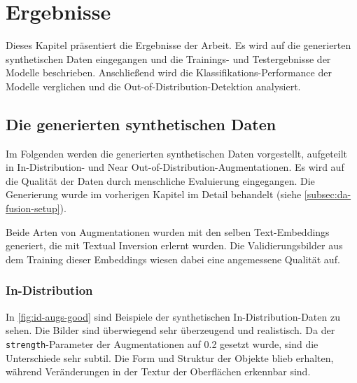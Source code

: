 \chapter{Ergebnisse} \label{ch:results}

Dieses Kapitel präsentiert die Ergebnisse der Arbeit. Es wird auf die generierten synthetischen Daten eingegangen und die Trainings- und Testergebnisse der Modelle beschrieben. Anschließend wird die Klassifikations-Performance der Modelle verglichen und die Out-of-Distribution-Detektion analysiert.

\section{Die generierten synthetischen Daten} \label{sec:da-fusion-results}

Im Folgenden werden die generierten synthetischen Daten vorgestellt, aufgeteilt in In-Distribution- und Near Out-of-Distribution-Augmentationen. Es wird auf die Qualität der Daten durch menschliche Evaluierung eingegangen. Die Generierung wurde im vorherigen Kapitel im Detail behandelt (siehe \autoref{subsec:da-fusion-setup}).

Beide Arten von Augmentationen wurden mit den selben Text-Embeddings generiert, die mit Textual Inversion erlernt wurden. Die Validierungsbilder aus dem Training dieser Embeddings wiesen dabei eine angemessene Qualität auf.

\subsection{In-Distribution} \label{subsec:da-fusion-id-results}

In \autoref{fig:id-augs-good} sind Beispiele der synthetischen In-Distribution-Daten zu sehen. Die Bilder sind überwiegend sehr überzeugend und realistisch. Da der \lstinline{strength}-Parameter der Augmentationen auf 0.2 gesetzt wurde, sind die Unterschiede sehr subtil. Die Form und Struktur der Objekte blieb erhalten, während Veränderungen in der Textur der Oberflächen erkennbar sind.

